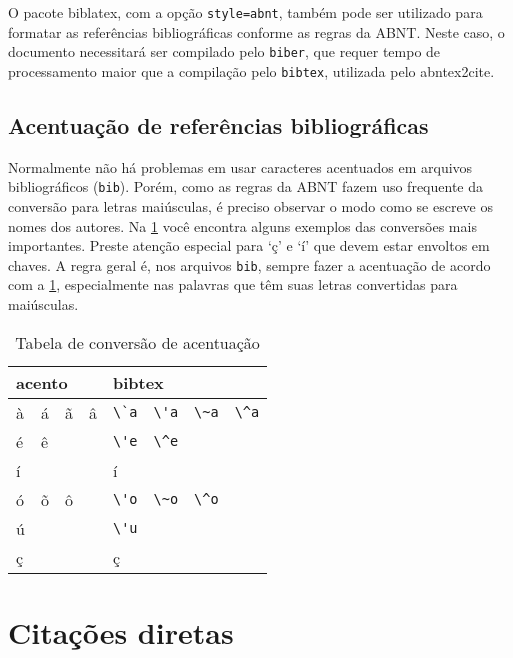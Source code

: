 O pacote \textsf{biblatex}, com a opção \texttt{style=abnt}, também pode ser utilizado para formatar as referências bibliográficas conforme as regras da ABNT. Neste caso, o documento necessitará ser compilado pelo \texttt{biber}, que requer tempo de processamento maior que a compilação pelo \texttt{bibtex}, utilizada pelo \textsf{abntex2cite}.

\subsection{Acentuação de referências bibliográficas}

Normalmente não há problemas em usar caracteres acentuados em arquivos bibliográficos (\texttt{bib}). Porém, como as regras da ABNT fazem uso frequente da conversão para letras maiúsculas, é preciso observar o modo como se escreve os nomes dos autores. Na \cref{tab:acentos} você encontra alguns exemplos das conversões mais importantes. Preste atenção especial para `ç' e `í' que devem estar envoltos em chaves. A regra geral é, nos arquivos \texttt{bib}, sempre fazer a acentuação de acordo com a \cref{tab:acentos}, especialmente nas palavras que têm suas letras convertidas para maiúsculas.

\begin{table}[htb]
\begin{center}
\caption{Tabela de conversão de acentuação}
\label{tab:acentos}
\begin{tabular}{llllllll} \toprule
\multicolumn{4}{l}{acento} & \multicolumn{4}{l}{bibtex} \\ \midrule
\`a & \'a & \~a & \^a & \verb|\`a| & \verb|\'a| & \verb|\~a| & \verb|\^a| \\
\'e & \^e & & & \verb|\'e| & \verb|\^e| & & \\
í & & & & \multicolumn{2}{l}{\Verb{{\'i}}} & & \\
\'o & \~o & \^o & & \verb|\'o| & \verb|\~o| & \verb|\^o| & \\
\'u & & & & \verb|\'u| & & & \\
{\c c} & & & & \multicolumn{2}{l}{\Verb{{\c c}}} & & \\ \bottomrule
\end{tabular}
\end{center}
\end{table}

\section{Citações diretas}\label{sec:citacao}

